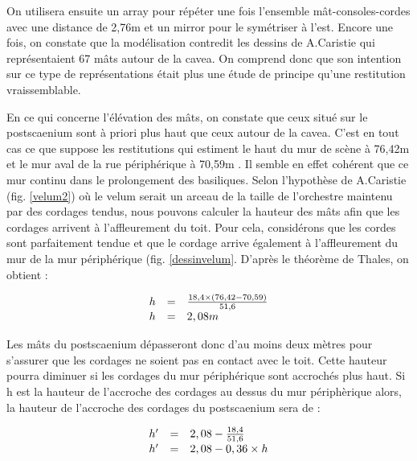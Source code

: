 On utilisera ensuite un \gls{array} pour répéter une fois l'ensemble mât-consoles-cordes avec une distance de 2,76m et un \gls{mirror} pour le symétriser à l'est. Encore une fois, on constate que la modélisation contredit les dessins de A.Caristie qui représentaient 67 mâts autour de la \gls{cavea}. On comprend donc que son intention sur ce type de représentations était plus une étude de principe qu'une restitution vraissemblable.

En ce qui concerne l'élévation des mâts, on constate que ceux situé sur le \gls{postscaenium} sont à priori plus haut que ceux autour de la \gls{cavea}. C'est en tout cas ce que suppose les restitutions qui estiment le haut du mur de scène à 76,42m et le mur aval de la rue périphérique à 70,59m \cite[Pl. XLVIII et XLIX]{orangePl}. Il semble en effet cohérent que ce mur continu dans le prolongement des \glspl{basilique}. Selon l'hypothèse de A.Caristie (fig. \ref{velum2}) où le \gls{velum} serait un arceau de la taille de l'orchestre maintenu par des cordages tendus, nous pouvons calculer la hauteur des mâts afin que les cordages arrivent à l'affleurement du toit. Pour cela, considérons que les cordes sont parfaitement tendue et que le cordage arrive également à l'affleurement du mur de la mur périphérique (fig. \ref{dessinvelum}. D'après le théorème de Thales, on obtient :

\begin{equation}
	\begin{array}{r c l}
		h & = & \frac{18,4\times(76,42-70,59)}{51,6} \\
		h & = & 2, 08m
	\end{array}
\end{equation}

Les mâts du \gls{postscaenium} dépasseront donc d'au moins deux mètres pour s'assurer que les cordages ne soient pas en contact avec le toit. Cette hauteur pourra diminuer si les cordages du mur périphérique sont accrochés plus haut. Si h est la hauteur de l'accroche des cordages au dessus du mur périphèrique alors, la hauteur de l'accroche des cordages du \gls{postscaenium} sera de :

\begin{equation}
	\begin{array}{r c l}
		h' & = & 2,08 - \frac{18,4}{51,6} \\
		h' & = & 2, 08 - 0,36 \times h
	\end{array}
\end{equation}

